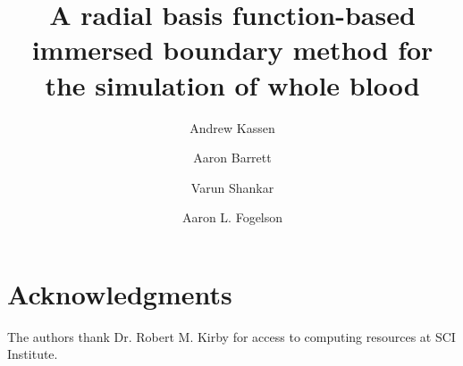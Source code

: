 \documentclass[1p,preprint,fleqn,number,sort&compress,times]{elsarticle}
\begin{document}
\begin{frontmatter}

\title{A radial basis function-based immersed boundary method for the simulation of whole blood}

\author[1]{Andrew Kassen}  
\author[1]{Aaron Barrett}               
\author[2]{Varun Shankar}               
\author[1]{Aaron L. Fogelson}  

\address[1]{Department of Mathematics, University of Utah, Salt Lake City, UT 84112, USA}
\address[2]{School of Computing, University of Utah, Salt Lake City, UT 84112, USA}
\address[3]{Department of Bioengineering, University of Utah, Salt Lake City, UT 84112, USA}


\begin{abstract}
\end{abstract}

\begin{keyword}
\end{keyword}

\end{frontmatter}







\section*{Acknowledgments}
The authors thank Dr. Robert M. Kirby for access to computing resources at SCI Institute.


\end{document}
